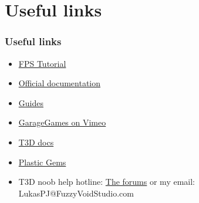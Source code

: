 \section{Useful links}
\begin{frame}
\frametitle{Useful links}
	\begin{itemize}
	\item { \color{blue} \href{http://www.garagegames.com/products/torque-3d/fps}{FPS Tutorial} }
	\item {\color{blue} \href{http://www.garagegames.com/products/torque-3d/documentation}{Official documentation}}
	\item {\color{blue} \href{http://www.garagegames.com/products/torque-3d/guides}{Guides}}
	\item {\color{blue} \href{http://www.vimeo.com/torquepowered}{GarageGames on Vimeo}}
	\item {\color{blue} \href{http://docs.garagegames.com/torque-3d/official/}{T3D docs}}
	\item {\color{blue}\href{http://garagegames.com/community/resources/view/14868}{Plastic Gems}}
	\item T3D noob help hotline: {\color{blue}\href{http://garagegames.com/community/forums}{The forums}} or my email: LukasPJ@FuzzyVoidStudio.com
	\end{itemize}
\end{frame}

